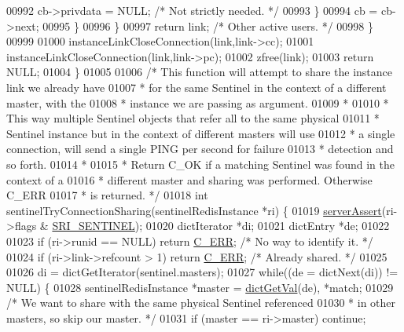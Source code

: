 \begin{DoxyCode}
{{{{{{{{{{{{{{{00992                     cb->privdata = NULL; \textcolor{comment}{/* Not strictly needed. */}
00993                 \}
00994                 cb = cb->next;
00995             \}
00996         \}
00997         \textcolor{keywordflow}{return} link; \textcolor{comment}{/* Other active users. */}
00998     \}
00999 
01000     instanceLinkCloseConnection(link,link->cc);
01001     instanceLinkCloseConnection(link,link->pc);
01002     zfree(link);
01003     \textcolor{keywordflow}{return} NULL;
01004 \}
01005 
01006 \textcolor{comment}{/* This function will attempt to share the instance link we already have}
01007 \textcolor{comment}{ * for the same Sentinel in the context of a different master, with the}
01008 \textcolor{comment}{ * instance we are passing as argument.}
01009 \textcolor{comment}{ *}
01010 \textcolor{comment}{ * This way multiple Sentinel objects that refer all to the same physical}
01011 \textcolor{comment}{ * Sentinel instance but in the context of different masters will use}
01012 \textcolor{comment}{ * a single connection, will send a single PING per second for failure}
01013 \textcolor{comment}{ * detection and so forth.}
01014 \textcolor{comment}{ *}
01015 \textcolor{comment}{ * Return C\_OK if a matching Sentinel was found in the context of a}
01016 \textcolor{comment}{ * different master and sharing was performed. Otherwise C\_ERR}
01017 \textcolor{comment}{ * is returned. */}
01018 \textcolor{keywordtype}{int} sentinelTryConnectionSharing(sentinelRedisInstance *ri) \{
01019     \hyperlink{server_8h_a88114b5169b4c382df6b56506285e56a}{serverAssert}(ri->flags & \hyperlink{sentinel_8c_a8ed55207b2af5d2dd314c951ef253f64}{SRI\_SENTINEL});
01020     dictIterator *di;
01021     dictEntry *de;
01022 
01023     \textcolor{keywordflow}{if} (ri->runid == NULL) \textcolor{keywordflow}{return} \hyperlink{server_8h_af98ac28d5f4d23d7ed5985188e6fb7d1}{C\_ERR}; \textcolor{comment}{/* No way to identify it. */}
01024     \textcolor{keywordflow}{if} (ri->link->refcount > 1) \textcolor{keywordflow}{return} \hyperlink{server_8h_af98ac28d5f4d23d7ed5985188e6fb7d1}{C\_ERR}; \textcolor{comment}{/* Already shared. */}
01025 
01026     di = dictGetIterator(sentinel.masters);
01027     \textcolor{keywordflow}{while}((de = dictNext(di)) != NULL) \{
01028         sentinelRedisInstance *master = \hyperlink{dict_8h_ae8d2cc391873b2bea2b87c4f80f43120}{dictGetVal}(de), *match;
01029         \textcolor{comment}{/* We want to share with the same physical Sentinel referenced}
01030 \textcolor{comment}{         * in other masters, so skip our master. */}
01031         \textcolor{keywordflow}{if} (master == ri->master) \textcolor{keywordflow}{continue};
}}}}}}}}}}}}}}}
\end{DoxyCode}
